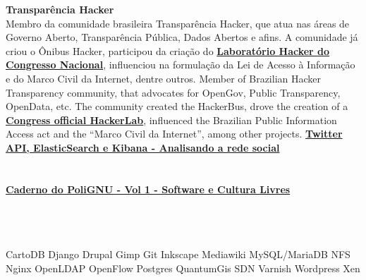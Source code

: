 \documentclass[]{friggeri-cv}
\begin{document}
\textbf{Transparência Hacker }\\
%
{Membro da comunidade brasileira Transparência Hacker, que atua nas áreas de Governo Aberto, Transparência Pública, Dados Abertos e afins. A comunidade já criou o Ônibus Hacker, participou da criação do \href{http://blog.openingparliament.org/post/72099651071/a-permanent-hacker-space-in-the-brazilian-congress}{\textbf{Laboratório Hacker do Congresso Nacional}}, influenciou na formulação da Lei de Acesso à Informação e do Marco Civil da Internet, dentre outros.}%
{Member of Brazilian Hacker Transparency community, that advocates for OpenGov, Public Transparency, OpenData, etc. The community created the HackerBus, drove the creation of a \href{http://blog.openingparliament.org/post/72099651071/a-permanent-hacker-space-in-the-brazilian-congress}{\textbf{Congress official HackerLab}}, influenced the Brazilian Public Information Access act and the ``Marco Civil da Internet'', among other projects.}
%
%
{\href{http://polignu.org/artigo/twitter-api-elasticsearch-e-kibana-analisando-rede-social}{\textbf{Twitter API, ElasticSearch e Kibana - Analisando a rede social}}\\
\emph{}\\}\\
\href{http://polignu.org/administrativo/caderno-polignu-volume-1-software-e-culturas-livres}{\textbf{Caderno do PoliGNU - Vol 1 - Software e Cultura Livres}}\\
\emph{}
%
%
\newpage
{}%
%
%
\begin{aside}
~
~
~
  \section{}
    CartoDB
    Django
    Drupal
    Gimp
    Git
    Inkscape
    Mediawiki
    MySQL/MariaDB
    NFS
    Nginx
    OpenLDAP
    OpenFlow
    Postgres
    QuantumGis
    SDN
    Varnish
    Wordpress
    Xen
\end{aside}
\end{document}
